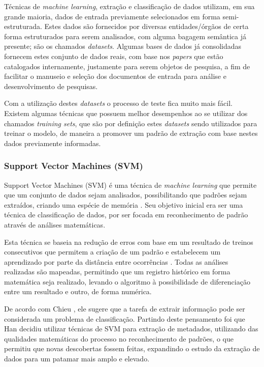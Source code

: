 \begin{textnew}
Técnicas de \emph{machine learning}, extração e classificação de dados utilizam, em sua grande maioria, dados de entrada previamente selecionados em forma semi-estruturada. Estes dados são fornecidos por diversas entidades/órgãos de certa forma estruturados para serem analisados, com alguma bagagem semântica já presente; são os chamados \emph{datasets}. Algumas bases de dados já consolidadas fornecem estes conjunto de dados reais, com base nos \emph{papers} que estão catalogados internamente, justamente para serem objetos de pesquisa, a fim de facilitar o manuseio e seleção dos documentos de entrada para análise e desenvolvimento de pesquisas.

Com a utilização destes \emph{datasets} o processo de teste fica muito mais fácil. Existem algumas técnicas que possuem melhor desempenhos ao se utilizar dos chamados \emph{training sets}, que são por definição estes \emph{datasets} sendo utilizados para treinar o modelo, de maneira a promover um padrão de extração com base nestes dados previamente informadas.
\end{textnew}

\subsubsection{Support Vector Machines (SVM)}
\label{sssec:svm}

\begin{textnew}
Support Vector Machines (SVM) é uma técnica de \textit{machine learning} que permite que um conjunto de dados sejam analisados, possibilitando que padrões sejam extraídos, criando uma espécie de memória \cite{Vapnik-SVM}. Seu objetivo inicial era ser uma técnica de classificação de dados, por ser focada em reconhecimento de padrão através de análises matemáticas.

Esta técnica se baseia na redução de erros com base em um resultado de treinos consecutivos que permitem a criação de um padrão e estabelecem um aprendizado por parte da distância entre ocorrências \cite{Vapnik-SVM}. Todas as análises realizadas são mapeadas, permitindo que um registro histórico em forma matemática seja realizado, levando o algoritmo à possibilidade de diferenciação entre um resultado e outro, de forma numérica.

De acordo com Chieu \cite{Chieu}, ele sugere que a tarefa de extrair informação pode ser considerada um problema de classificação. Partindo deste pensamento foi que Han \cite{Han-SVM} decidiu utilizar técnicas de SVM para extração de metadados, utilizando das qualidades matemáticas do processo no reconhecimento de padrões, o que permitiu que novas descobertas fossem feitas, expandindo o estudo da extração de dados para um patamar mais amplo e elevado.

\end{textnew}

